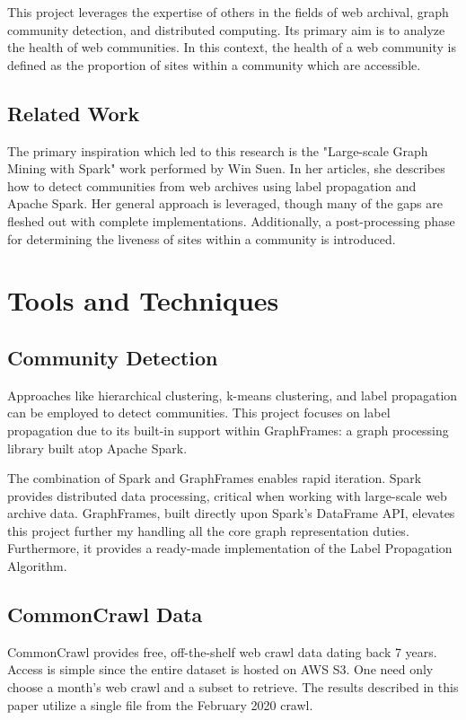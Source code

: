 \documentclass[conference]{IEEEtran}
\begin{document}
This project leverages the expertise of others in the fields of web archival, graph community detection, and distributed computing. Its primary aim is to analyze the health of web communities. In this context, the health of a web community is defined as the proportion of sites within a community which are accessible.

\subsection{Related Work}

The primary inspiration which led to this research is the "Large-scale Graph Mining with Spark" work performed by Win Suen. In her articles, she describes how to detect communities from web archives using label propagation and Apache Spark. Her general approach is leveraged, though many of the gaps are fleshed out with complete implementations. Additionally, a post-processing phase for determining the liveness of sites within a community is introduced.

\section{Tools and Techniques}

\subsection{Community Detection}

Approaches like hierarchical clustering, k-means clustering, and label propagation can be employed to detect communities. This project focuses on label propagation due to its built-in support within GraphFrames: a graph processing library built atop Apache Spark.

The combination of Spark and GraphFrames enables rapid iteration. Spark provides distributed data processing, critical when working with large-scale web archive data. GraphFrames, built directly upon Spark's DataFrame API, elevates this project further my handling all the core graph representation duties. Furthermore, it provides a ready-made implementation of the Label Propagation Algorithm.

\subsection{CommonCrawl Data}

CommonCrawl provides free, off-the-shelf web crawl data dating back 7 years. Access is simple since the entire dataset is hosted on AWS S3. One need only choose a month's web crawl and a subset to retrieve. The results described in this paper utilize a single file from the February 2020 crawl.
\end{document}
